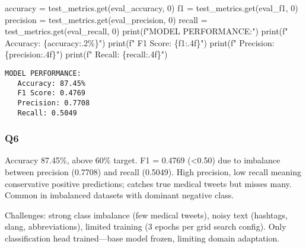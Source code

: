 \documentclass[
  letterpaper,
  DIV=11,
  numbers=noendperiod]{scrartcl}
\newenvironment{Shaded}{\begin{snugshade}}{\end{snugshade}}
\newcommand{\BuiltInTok}[1]{\textcolor[rgb]{0.00,0.23,0.31}{#1}}
\newcommand{\DecValTok}[1]{\textcolor[rgb]{0.68,0.00,0.00}{#1}}
\newcommand{\NormalTok}[1]{\textcolor[rgb]{0.00,0.23,0.31}{#1}}
\newcommand{\OperatorTok}[1]{\textcolor[rgb]{0.37,0.37,0.37}{#1}}
\newcommand{\SpecialCharTok}[1]{\textcolor[rgb]{0.37,0.37,0.37}{#1}}
\newcommand{\SpecialStringTok}[1]{\textcolor[rgb]{0.13,0.47,0.30}{#1}}
\newcommand{\StringTok}[1]{\textcolor[rgb]{0.13,0.47,0.30}{#1}}
\begin{document}
\begin{Shaded}
\begin{Highlighting}[]
\NormalTok{accuracy }\OperatorTok{=}\NormalTok{ test\_metrics.get(}\StringTok{\textquotesingle{}eval\_accuracy\textquotesingle{}}\NormalTok{, }\DecValTok{0}\NormalTok{)}
\NormalTok{f1 }\OperatorTok{=}\NormalTok{ test\_metrics.get(}\StringTok{\textquotesingle{}eval\_f1\textquotesingle{}}\NormalTok{, }\DecValTok{0}\NormalTok{)}
\NormalTok{precision }\OperatorTok{=}\NormalTok{ test\_metrics.get(}\StringTok{\textquotesingle{}eval\_precision\textquotesingle{}}\NormalTok{, }\DecValTok{0}\NormalTok{)}
\NormalTok{recall }\OperatorTok{=}\NormalTok{ test\_metrics.get(}\StringTok{\textquotesingle{}eval\_recall\textquotesingle{}}\NormalTok{, }\DecValTok{0}\NormalTok{)}
\BuiltInTok{print}\NormalTok{(}\SpecialStringTok{f"MODEL PERFORMANCE:"}\NormalTok{)}
\BuiltInTok{print}\NormalTok{(}\SpecialStringTok{f"   Accuracy: }\SpecialCharTok{\{}\NormalTok{accuracy}\SpecialCharTok{:.2\%\}}\SpecialStringTok{"}\NormalTok{)}
\BuiltInTok{print}\NormalTok{(}\SpecialStringTok{f"   F1 Score: }\SpecialCharTok{\{}\NormalTok{f1}\SpecialCharTok{:.4f\}}\SpecialStringTok{"}\NormalTok{)}
\BuiltInTok{print}\NormalTok{(}\SpecialStringTok{f"   Precision: }\SpecialCharTok{\{}\NormalTok{precision}\SpecialCharTok{:.4f\}}\SpecialStringTok{"}\NormalTok{)}
\BuiltInTok{print}\NormalTok{(}\SpecialStringTok{f"   Recall: }\SpecialCharTok{\{}\NormalTok{recall}\SpecialCharTok{:.4f\}}\SpecialStringTok{"}\NormalTok{)}
\end{Highlighting}
\end{Shaded}

\label{prob3}
\begin{verbatim}
MODEL PERFORMANCE:
   Accuracy: 87.45%
   F1 Score: 0.4769
   Precision: 0.7708
   Recall: 0.5049
\end{verbatim}

\subsubsection{Q6}\label{q6}

Accuracy 87.45\%, above 60\% target. F1 = 0.4769 (\textless0.50) due to
imbalance between precision (0.7708) and recall (0.5049). High
precision, low recall meaning conservative positive predictions; catches
true medical tweets but misses many. Common in imbalanced datasets with
dominant negative class.

Challenges: strong class imbalance (few medical tweets), noisy text
(hashtags, slang, abbreviations), limited training (3 epochs per grid
search config). Only classification head trained---base model frozen,
limiting domain adaptation.
\end{document}
